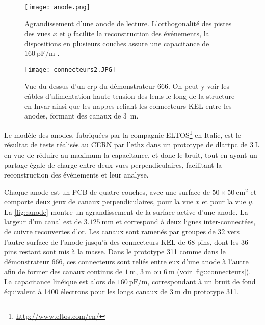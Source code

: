             \begin{figure}[htbp]
                \begin{center}\texttt{[image: anode.png]}\end{center}
                \caption[Agrandissement d'une anode de lecture.]{Agrandissement d'une anode de lecture. L'orthogonalité des pistes des vues $x$ et $y$ facilite la reconstruction des événements, la dispositions en plusieurs couches assure une capacitance de $\SI{160}{\pico\farad\per\meter}$ \cite{cantini3L}.}
                \label{fig::anode}
            \end{figure}
            \begin{figure}[htbp]
                \begin{center}\texttt{[image: connecteurs2.JPG]}\end{center}
                \caption[Vue du dessus d'un \gls{crp} du démonstrateur 666.]{Vue du dessus d'un \gls{crp} du démonstrateur 666. On peut y voir les câbles d'alimentation haute tension des \glspl{lem} le long de la structure en Invar ainsi que les nappes reliant les connecteurs KEL entre les anodes, formant des canaux de \SI{3}{\meter}.}
                \label{fig::connecteurs}
            \end{figure}
            
            Le modèle des anodes, fabriquées par la compagnie ELTOS\footnote{\url{http://www.eltos.com/en/}} en Italie, est le résultat de tests réalisés au CERN par l'\gls{ethz} dans un prototype de \gls{dlartpc} de $\SI{3}{\liter}$ \cite{cantini_anode} en vue de réduire au maximum la capacitance, et donc le bruit, tout en ayant un partage égale de charge entre deux vues perpendiculaires, facilitant la reconstruction des événements et leur analyse.
            
            Chaque anode est un PCB de quatre couches, avec une surface de  $50\times\SI{50}{\centi\meter\squared}$ et comporte deux jeux de canaux perpendiculaires,  pour la vue $x$ et  pour la vue $y$. La \autoref{fig::anode} montre un agrandissement de la surface active d'une anode. La largeur d'un canal est de $\SI{3.125}{\milli\meter}$ et correspond à deux lignes inter-connectées, de cuivre recouvertes d'or. Les canaux sont ramenés par groupes de 32 vers l'autre surface de l'anode jusqu'à des connecteurs KEL de 68 pins, dont les 36 pins restant sont mis à la masse. Dans le prototype 311 comme dans le démonstrateur 666, ces connecteurs sont reliés entre eux d'une anode à l'autre afin de former des canaux continus de $\SI{1}{\meter}$, $\SI{3}{\meter}$ ou $\SI{6}{\meter}$ (voir  \autoref{fig::connecteurs}). La capacitance linéique est alors de $\SI{160}{\pico\farad\per\meter}$, correspondant à un bruit de fond équivalent à 1400 électrons \cite{311paper2018} pour les longs canaux de $\SI{3}{\meter}$ du prototype 311.
            
